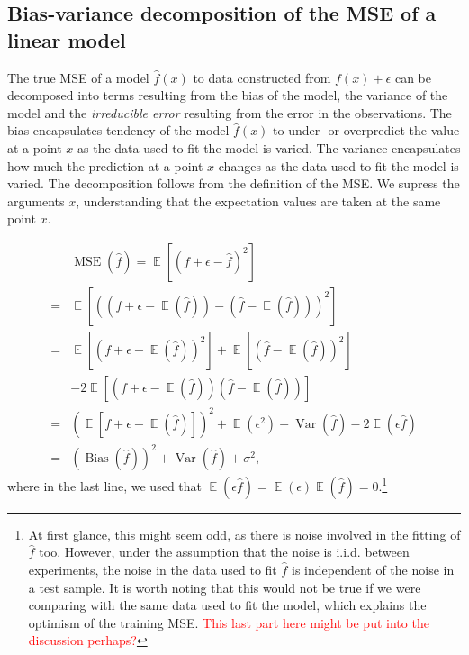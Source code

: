 \documentclass[twocolumn,english,notitlepage]{article}
\newcommand{\comment}[1]{\textcolor{red}{#1}}
\newcommand{\pclosed}[1]{\left(#1\right)}
\newcommand{\bclosed}[1]{\left[#1\right]}
\renewcommand{\expval}{\operatorname{\mathbb{E}}}
\renewcommand{\var}{\operatorname{Var}}
\newcommand{\bias}{\operatorname{Bias}}
\begin{document}
\begin{appendices}
    \section{Bias-variance decomposition of the MSE of a linear model} \label{app:sec:bvdecomp}
        The true MSE of a model $\hat{f}(x)$ to data constructed from $f(x) + \epsilon$ can be decomposed into terms resulting from the bias of the model, the variance of the model and the \textit{irreducible error} resulting from the error in the observations. The bias encapsulates tendency of the model $\hat{f}(x)$ to under- or overpredict the value at a point $x$ as the data used to fit the model is varied. The variance encapsulates how much the prediction at a point $x$ changes as the data used to fit the model is varied. The decomposition follows from the definition of the MSE. We supress the arguments $x$, understanding that the expectation values are taken at the same point $x$.

        \begin{align} \nonumber
            &\operatorname{MSE}(\hat{f}) = \expval\bclosed{(f+\epsilon-\hat{f})^2} \\ \nonumber
            =& \expval\bclosed{\pclosed{(f+\epsilon-\expval(\hat{f}))- (\hat{f}-\expval(\hat{f}))}^2} \\ \nonumber
            =& \expval\bclosed{\pclosed{f+\epsilon-\expval(\hat{f})}^2} + \expval\bclosed{\pclosed{\hat{f}-\expval(\hat{f})}^2} \\ \nonumber
            &-2 \expval\bclosed{ (f+\epsilon-\expval(\hat{f})) (\hat{f}-\expval(\hat{f})) } \\ \nonumber
            =& \pclosed{\expval\bclosed{f+\epsilon-\expval(\hat{f})}}^2 + \expval(\epsilon^2) + \var(\hat{f}) - 2\expval(\epsilon \hat{f}) \\
            =& \pclosed{\bias(\hat{f})}^2 + \var(\hat{f}) + \sigma^2,
        \end{align}
        where in the last line, we used that $\expval(\epsilon\hat{f}) = \expval(\epsilon)\expval(\hat{f})=0$.\footnote{At first glance, this might seem odd, as there is noise involved in the fitting of $\hat{f}$ too. However, under the assumption that the noise is i.i.d. between experiments, the noise in the data used to fit $\hat{f}$ is independent of the noise in a test sample. It is worth noting that this would not be true if we were comparing with the same data used to fit the model, which explains the optimism of the training MSE. \comment{This last part here might be put into the discussion perhaps?}}


\end{appendices}
\end{document}
